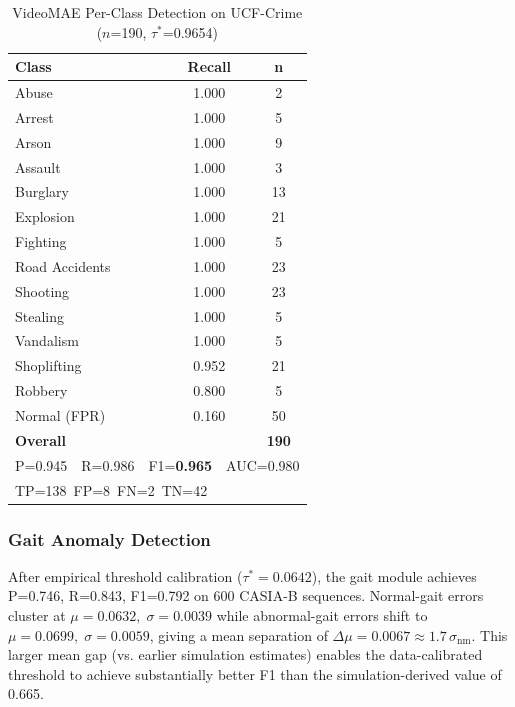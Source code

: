 \documentclass[conference]{IEEEtran}
\begin{document}
\begin{table}[h]
\caption{VideoMAE Per-Class Detection on UCF-Crime ($n$=190, $\tau^*$=0.9654)}
\label{tab:mae}
\centering
\begin{tabular}{lcc}
\toprule
\textbf{Class} & \textbf{Recall} & \textbf{n}\\
\midrule
Abuse          & 1.000 &  2\\
Arrest         & 1.000 &  5\\
Arson          & 1.000 &  9\\
Assault        & 1.000 &  3\\
Burglary       & 1.000 & 13\\
Explosion      & 1.000 & 21\\
Fighting       & 1.000 &  5\\
Road Accidents & 1.000 & 23\\
Shooting       & 1.000 & 23\\
Stealing       & 1.000 &  5\\
Vandalism      & 1.000 &  5\\
Shoplifting    & 0.952 & 21\\
Robbery        & 0.800 &  5\\
Normal (FPR)   & 0.160 & 50\\
\midrule
\textbf{Overall} & & \textbf{190}\\
\multicolumn{3}{l}{\footnotesize P=0.945\ \ R=0.986\ \ F1=\textbf{0.965}\ \ AUC=0.980}\\
\multicolumn{3}{l}{\footnotesize TP=138\ FP=8\ FN=2\ TN=42}\\
\bottomrule
\end{tabular}
\end{table}

\subsubsection{Gait Anomaly Detection}
After empirical threshold calibration ($\tau^*=0.0642$), the gait module
achieves P=0.746, R=0.843, F1=0.792 on 600 CASIA-B sequences.
Normal-gait errors cluster at $\mu=0.0632,\;\sigma=0.0039$ while
abnormal-gait errors shift to $\mu=0.0699,\;\sigma=0.0059$, giving a
mean separation of $\Delta\mu=0.0067 \approx 1.7\,\sigma_\text{nm}$.
This larger mean gap (vs. earlier simulation estimates) enables the
data-calibrated threshold to achieve substantially better F1 than the
simulation-derived value of 0.665.
\end{document}
